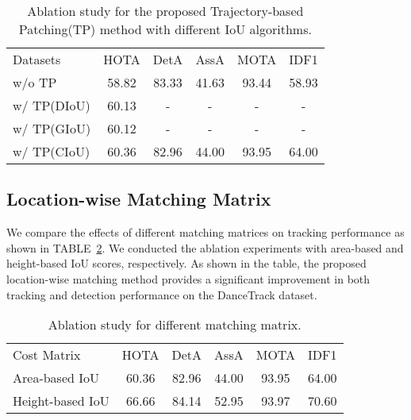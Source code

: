 \documentclass[10pt,twocolumn,letterpaper]{article}
\begin{document}
\setlength{\tabcolsep}{4pt}
\begin{table}
\begin{center}
\caption{Ablation study for the proposed Trajectory-based Patching(TP) method with different IoU algorithms.}
\label{table:iou}
\begin{tabular}{lccccc}
\hline\noalign{\smallskip}
Datasets & HOTA & DetA & AssA & MOTA & IDF1\\
\noalign{\smallskip}
\hline
\noalign{\smallskip}
w/o TP & 58.82 & 83.33 & 41.63 & 93.44 & 58.93\\
w/ TP(DIoU) & 60.13 & - & - & - & -\\
w/ TP(GIoU) & 60.12 & - & - & - & -\\
w/ TP(CIoU) & 60.36 & 82.96 & 44.00 & 93.95 & 64.00\\
\hline
\end{tabular}
\end{center}
\end{table}
\setlength{\tabcolsep}{1.4pt}

\subsection{Location-wise Matching Matrix}

We compare the effects of different matching matrices on tracking performance as shown in TABLE~\ref{table:local-wise}. We conducted the ablation experiments with area-based and height-based IoU scores, respectively. As shown in the table, the proposed location-wise matching method provides a significant improvement in both tracking and detection performance on the DanceTrack dataset.

\setlength{\tabcolsep}{4pt}
\begin{table}
\begin{center}
\caption{Ablation study for different matching matrix. }
\label{table:local-wise}
\begin{tabular}{lccccc}
\hline\noalign{\smallskip}
Cost Matrix & HOTA & DetA & AssA & MOTA & IDF1 \\
\noalign{\smallskip}
\hline
\noalign{\smallskip}
Area-based IoU & 60.36 & 82.96 & 44.00 & 93.95 & 64.00\\
Height-based IoU & 66.66 & 84.14 & 52.95 & 93.97 & 70.60\\
\hline
\end{tabular}
\end{center}
\end{table}
\setlength{\tabcolsep}{1.4pt}
\end{document}
